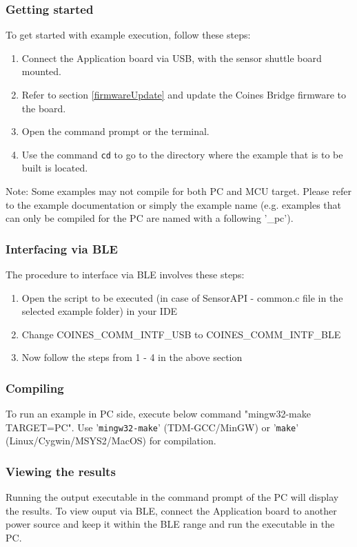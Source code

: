 \documentclass[11pt,headings=small]{scrartcl}
\begin{document}
\subsubsection{Getting started}
To get started with example execution, follow these steps:
\begin{enumerate}
\item Connect the Application board via USB, with the sensor shuttle board mounted.
\item Refer to section \ref{firmwareUpdate} and update the Coines Bridge firmware to the board.
\item Open the command prompt or the terminal.
\item Use the command \texttt{cd} to go to the directory where the example that is to be built is located.
\end{enumerate}
Note: Some examples may not compile for both PC and MCU target. Please refer to the example documentation or simply the example name (e.g. examples that can only be compiled for the PC are named with a following '\_pc').

\subsubsection{Interfacing via BLE}
The procedure to interface via BLE involves these steps:
\begin{enumerate}
	\item Open the script to be executed (in case of SensorAPI - common.c file in the selected example folder) in your IDE
	\item Change COINES\_COMM\_INTF\_USB  to COINES\_COMM\_INTF\_BLE
	\item Now follow the steps from 1 - 4 in the above section
\end{enumerate}

\subsubsection{Compiling}
To run an example in PC side, execute below command "mingw32-make TARGET=PC". Use '\texttt{mingw32-make}' (TDM-GCC/MinGW) or '\texttt{make}' (Linux/Cygwin/MSYS2/MacOS) for compilation.

\subsubsection{Viewing the results}
Running the output executable in the command prompt of the PC will display the results. To view ouput via BLE, connect the Application board to another power source and keep it within the BLE range and run the executable in the PC.
\end{document}
